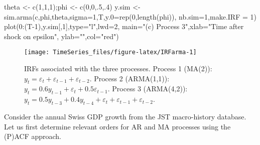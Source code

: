 \documentclass[
  12pt,
]{book}
\newenvironment{Shaded}{\begin{snugshade}}{\end{snugshade}}
\newcommand{\AttributeTok}[1]{\textcolor[rgb]{0.77,0.63,0.00}{#1}}
\newcommand{\DecValTok}[1]{\textcolor[rgb]{0.00,0.00,0.81}{#1}}
\newcommand{\FunctionTok}[1]{\textcolor[rgb]{0.00,0.00,0.00}{#1}}
\newcommand{\NormalTok}[1]{#1}
\newcommand{\OtherTok}[1]{\textcolor[rgb]{0.56,0.35,0.01}{#1}}
\newcommand{\SpecialCharTok}[1]{\textcolor[rgb]{0.00,0.00,0.00}{#1}}
\newcommand{\StringTok}[1]{\textcolor[rgb]{0.31,0.60,0.02}{#1}}
\theoremstyle{definition}
\theoremstyle{definition}
\theoremstyle{definition}
\theoremstyle{definition}
\theoremstyle{remark}
\begin{document}
\begin{Shaded}
\begin{Highlighting}[]
\NormalTok{theta }\OtherTok{\textless{}{-}} \FunctionTok{c}\NormalTok{(}\DecValTok{1}\NormalTok{,}\DecValTok{1}\NormalTok{,}\DecValTok{1}\NormalTok{);phi }\OtherTok{\textless{}{-}} \FunctionTok{c}\NormalTok{(}\DecValTok{0}\NormalTok{,}\DecValTok{0}\NormalTok{,.}\DecValTok{5}\NormalTok{,.}\DecValTok{4}\NormalTok{)}
\NormalTok{y.sim }\OtherTok{\textless{}{-}} \FunctionTok{sim.arma}\NormalTok{(c,phi,theta,}\AttributeTok{sigma=}\DecValTok{1}\NormalTok{,T,}\AttributeTok{y.0=}\FunctionTok{rep}\NormalTok{(}\DecValTok{0}\NormalTok{,}\FunctionTok{length}\NormalTok{(phi)),}
                  \AttributeTok{nb.sim=}\DecValTok{1}\NormalTok{,}\AttributeTok{make.IRF =} \DecValTok{1}\NormalTok{)}
\FunctionTok{plot}\NormalTok{(}\DecValTok{0}\SpecialCharTok{:}\NormalTok{(T}\DecValTok{{-}1}\NormalTok{),y.sim[,}\DecValTok{1}\NormalTok{],}\AttributeTok{type=}\StringTok{"l"}\NormalTok{,}\AttributeTok{lwd=}\DecValTok{2}\NormalTok{,}
     \AttributeTok{main=}\StringTok{"(c) Process 3"}\NormalTok{,}\AttributeTok{xlab=}\StringTok{"Time after shock on epsilon"}\NormalTok{,}
     \AttributeTok{ylab=}\StringTok{""}\NormalTok{,}\AttributeTok{col=}\StringTok{"red"}\NormalTok{)}
\end{Highlighting}
\end{Shaded}

\begin{figure}
\texttt{[image: TimeSeries\_files/figure-latex/IRFarma-1]} \caption{IRFs associated with the three processes. Process 1 (MA(2)): $y_t = \varepsilon_t + \varepsilon_{t-1} + \varepsilon_{t-2}$. Process 2 (ARMA(1,1)): $y_{t}=0.6y_{t-1} + \varepsilon_t + 0.5\varepsilon_{t-1}$. Process 3 (ARMA(4,2)): $y_{t}=0.5y_{t-3} + 0.4y_{t-4} + \varepsilon_t + \varepsilon_{t-1} + \varepsilon_{t-2}$.}\label{fig:IRFarma}
\end{figure}

Consider the annual Swiss GDP growth from the JST macro-history database. Let us first determine relevant orders for AR and MA processes using the (P)ACF approach.
\end{document}

